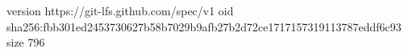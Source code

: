 version https://git-lfs.github.com/spec/v1
oid sha256:fbb301ed2453730627b58b7029b9afb27b2d72ce1717157319113787eddf6c93
size 796
